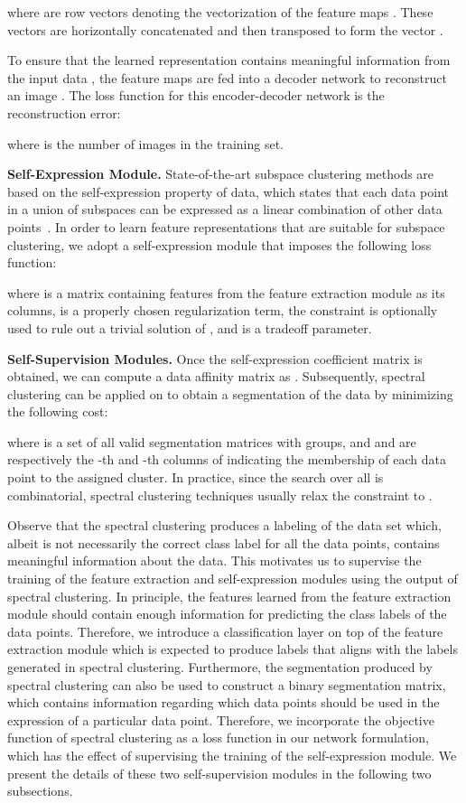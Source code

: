 \documentclass[10pt,twocolumn,letterpaper]{article}
\newcommand{\myparagraph}[1]{\smallskip\noindent\textbf{#1.}}
\begin{document}
where  are row vectors denoting the vectorization of the feature maps .
These vectors are horizontally concatenated and then transposed to form the vector .

To ensure that the learned representation  contains meaningful information from the input data , the feature maps  are fed into a decoder network to reconstruct an image .
The loss function for this encoder-decoder network is the reconstruction error:

where  is the number of images in the training set.


\myparagraph{Self-Expression Module}
State-of-the-art subspace clustering methods are based on the self-expression property of data, which states that each data point in a union of subspaces can be expressed as a linear combination of other data points~\cite{Elham:CVPR09,Vidal:Springer16}. In order to learn feature representations that are suitable for subspace clustering, we adopt a self-expression module that imposes the following loss function:

where  is a matrix containing features from the feature extraction module as its columns,  is a properly chosen regularization term, the constraint  is optionally used to rule out a trivial solution of , and  is a tradeoff parameter.

\myparagraph{Self-Supervision Modules}
Once the self-expression coefficient matrix  is obtained,
we can compute a data affinity matrix as .
Subsequently, spectral clustering can be applied on  to obtain a segmentation of the data by minimizing the following cost:

where  is a set of all valid segmentation matrices with  groups, and  and  are respectively the -th and -th columns of  indicating the membership of each data point to the assigned cluster. In practice, since the search over all  is combinatorial, spectral clustering techniques usually relax the constraint  to .

Observe that the spectral clustering produces a labeling of the data set which, albeit is not necessarily the correct class label for all the data points, contains meaningful information about the data.
This motivates us to supervise the training of the feature extraction and self-expression modules using the output of spectral clustering.
In principle, the features learned from the feature extraction module should contain enough information for predicting the class labels of the data points.
Therefore, we introduce a classification layer on top of the feature extraction module which is expected to produce labels that aligns with the labels generated in spectral clustering. Furthermore, the segmentation produced by
spectral clustering can also be used to
construct a binary segmentation matrix, which contains information regarding which data points should be used in the expression of a particular data point.
Therefore, we incorporate the objective function of spectral clustering as a loss function in our network formulation, which has the effect of supervising the training of the self-expression module.
We present the details of these two self-supervision modules in the following two subsections.
\end{document}
